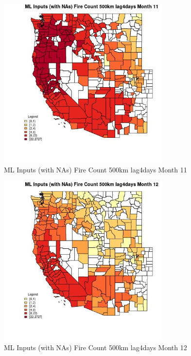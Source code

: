 \begin{figure} 
\centering  
\includegraphics[width=0.77\textwidth]{Code_Outputs/Report_ML_input_PM25_Step4_part_f_de_duplicated_aveswNAs_CountyFire_Count_500km_lag4daysmedianMonth11.jpg} 
\caption{\label{fig:Report_ML_input_PM25_Step4_part_f_de_duplicated_aveswNAsCountyFire_Count_500km_lag4daysmedianMonth11}ML Inputs (with NAs) Fire Count 500km lag4days Month 11} 
\end{figure} 
 

\begin{figure} 
\centering  
\includegraphics[width=0.77\textwidth]{Code_Outputs/Report_ML_input_PM25_Step4_part_f_de_duplicated_aveswNAs_CountyFire_Count_500km_lag4daysmedianMonth12.jpg} 
\caption{\label{fig:Report_ML_input_PM25_Step4_part_f_de_duplicated_aveswNAsCountyFire_Count_500km_lag4daysmedianMonth12}ML Inputs (with NAs) Fire Count 500km lag4days Month 12} 
\end{figure} 
 


